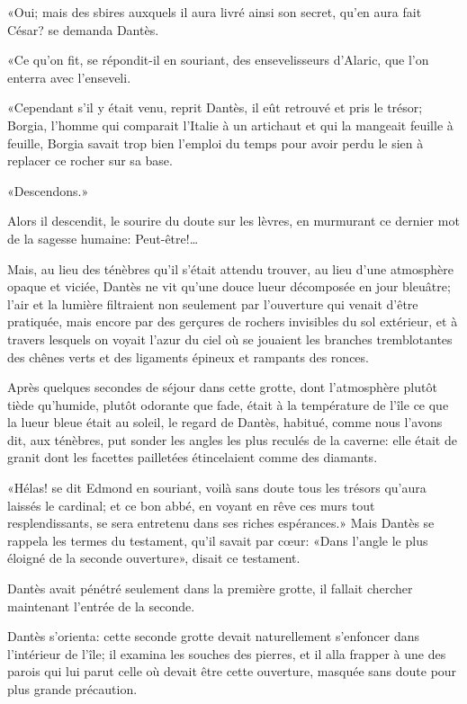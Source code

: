 «Oui; mais des sbires auxquels il aura livré ainsi son secret, qu'en aura fait César? se demanda Dantès.

«Ce qu'on fit, se répondit-il en souriant, des ensevelisseurs d'Alaric, que l'on enterra avec l'enseveli.

«Cependant s'il y était venu, reprit Dantès, il eût retrouvé et pris le trésor; Borgia, l'homme qui comparait l'Italie à un artichaut et qui la mangeait feuille à feuille, Borgia savait trop bien l'emploi du temps pour avoir perdu le sien à replacer ce rocher sur sa base.

«Descendons.»

Alors il descendit, le sourire du doute sur les lèvres, en murmurant ce dernier mot de la sagesse humaine: Peut-être!\dots

Mais, au lieu des ténèbres qu'il s'était attendu trouver, au lieu d'une atmosphère opaque et viciée, Dantès ne vit qu'une douce lueur décomposée en jour bleuâtre; l'air et la lumière filtraient non seulement par l'ouverture qui venait d'être pratiquée, mais encore par des gerçures de rochers invisibles du sol extérieur, et à travers lesquels on voyait l'azur du ciel où se jouaient les branches tremblotantes des chênes verts et des ligaments épineux et rampants des ronces.

Après quelques secondes de séjour dans cette grotte, dont l'atmosphère plutôt tiède qu'humide, plutôt odorante que fade, était à la température de l'île ce que la lueur bleue était au soleil, le regard de Dantès, habitué, comme nous l'avons dit, aux ténèbres, put sonder les angles les plus reculés de la caverne: elle était de granit dont les facettes pailletées étincelaient comme des diamants.

«Hélas! se dit Edmond en souriant, voilà sans doute tous les trésors qu'aura laissés le cardinal; et ce bon abbé, en voyant en rêve ces murs tout resplendissants, se sera entretenu dans ses riches espérances.» Mais Dantès se rappela les termes du testament, qu'il savait par cœur: «Dans l'angle le plus éloigné de la seconde ouverture», disait ce testament.

Dantès avait pénétré seulement dans la première grotte, il fallait chercher maintenant l'entrée de la seconde.

Dantès s'orienta: cette seconde grotte devait naturellement s'enfoncer dans l'intérieur de l'île; il examina les souches des pierres, et il alla frapper à une des parois qui lui parut celle où devait être cette ouverture, masquée sans doute pour plus grande précaution.

